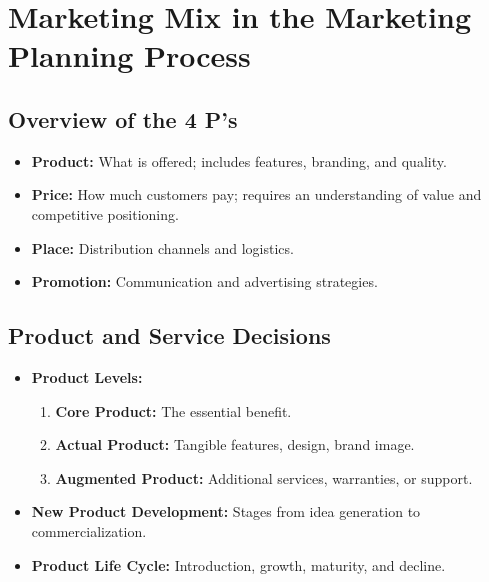 \documentclass[12pt,a4paper]{report}
\begin{document}
\chapter{Marketing Mix in the Marketing Planning Process}

\section{Overview of the 4 P's}
\begin{itemize}
    \item \textbf{Product:} What is offered; includes features, branding, and quality.
    \item \textbf{Price:} How much customers pay; requires an understanding of value and competitive positioning.
    \item \textbf{Place:} Distribution channels and logistics.
    \item \textbf{Promotion:} Communication and advertising strategies.
\end{itemize}

\section{Product and Service Decisions}
\begin{itemize}
    \item \textbf{Product Levels:}
         \begin{enumerate}[label=\alph*.]
             \item \textbf{Core Product:} The essential benefit.
             \item \textbf{Actual Product:} Tangible features, design, brand image.
             \item \textbf{Augmented Product:} Additional services, warranties, or support.
         \end{enumerate}
    \item \textbf{New Product Development:} Stages from idea generation to commercialization.
    \item \textbf{Product Life Cycle:} Introduction, growth, maturity, and decline.
\end{itemize}
\end{document}
